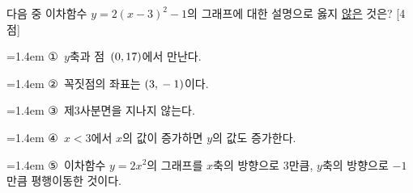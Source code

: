 다음 중 이차함수 $y=2(x-3)^2-1$의 그래프에 대한 설명으로 옳지 \underline{않은} 것은? \mbox{[4점]}
\par\medskip\par\noindent\hangindent=1.4em {\small ①}\ $y$축과 점~$(0{,}\mkern3mu 17)$에서 만난다.\par\noindent\hangindent=1.4em {\small ②}\ 꼭짓점의 좌표는 $(3{,}\mkern3mu -1)$이다.\par\noindent\hangindent=1.4em {\small ③}\ 제$3$사분면을 지나지 않는다.\par\noindent\hangindent=1.4em {\small ④}\ $x<3$에서 $x$의 값이 증가하면 $y$의 값도 증가한다.\par\noindent\hangindent=1.4em {\small ⑤}\ 이차함수 $y=2x^2$의 그래프를 $x$축의 방향으로 $3$만큼, $y$축의 방향으로 $-1$만큼 평행이동한 것이다.\par\medskip
